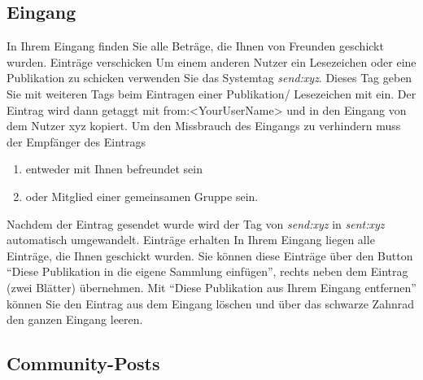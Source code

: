 \documentclass[a4paper,11pt,twoside]{scrbook}
\begin{document}
\subsection{Eingang}
In Ihrem Eingang finden Sie alle Beträge, die Ihnen von Freunden geschickt wurden.
\newline
\newline
Einträge verschicken
\newline
Um einem anderen Nutzer ein Lesezeichen oder eine Publikation zu schicken verwenden Sie das Systemtag \textit{send:xyz}. Dieses Tag geben Sie mit weiteren Tags beim Eintragen einer Publikation/ Lesezeichen mit ein. Der Eintrag wird dann getaggt mit from:<YourUserName> und in den Eingang von dem Nutzer xyz kopiert. Um den Missbrauch des Eingangs zu verhindern muss der Empfänger des Eintrags
\begin{enumerate}
    \item entweder mit Ihnen befreundet sein
    \item oder Mitglied einer gemeinsamen Gruppe sein.
\end{enumerate}
Nachdem der Eintrag gesendet wurde wird der Tag von \textit{send:xyz} in \textit{sent:xyz} automatisch umgewandelt.
\newline
\newline
Einträge erhalten
\newline
In Ihrem Eingang liegen alle Einträge, die Ihnen geschickt wurden. Sie können diese Einträge über den Button \enquote{Diese Publikation in die eigene Sammlung einfügen}, rechts neben dem Eintrag (zwei Blätter) übernehmen. Mit \enquote{Diese Publikation aus Ihrem Eingang entfernen} können Sie den Eintrag aus dem Eingang löschen und über das schwarze Zahnrad den ganzen Eingang leeren.
\subsection{Community-Posts}
\end{document}
